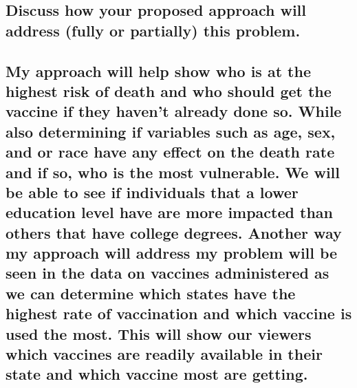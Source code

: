\documentclass[
]{article}
\begin{document}
\hypertarget{discuss-how-your-proposed-approach-will-address-fully-or-partially-this-problem.}{%
\subsection{Discuss how your proposed approach will address (fully or
partially) this
problem.}\label{discuss-how-your-proposed-approach-will-address-fully-or-partially-this-problem.}}

\hypertarget{my-approach-will-help-show-who-is-at-the-highest-risk-of-death-and-who-should-get-the-vaccine-if-they-havent-already-done-so.-while-also-determining-if-variables-such-as-age-sex-and-or-race-have-any-effect-on-the-death-rate-and-if-so-who-is-the-most-vulnerable.-we-will-be-able-to-see-if-individuals-that-a-lower-education-level-have-are-more-impacted-than-others-that-have-college-degrees.-another-way-my-approach-will-address-my-problem-will-be-seen-in-the-data-on-vaccines-administered-as-we-can-determine-which-states-have-the-highest-rate-of-vaccination-and-which-vaccine-is-used-the-most.-this-will-show-our-viewers-which-vaccines-are-readily-available-in-their-state-and-which-vaccine-most-are-getting.}{%
\subsection{My approach will help show who is at the highest risk of
death and who should get the vaccine if they haven't already done so.
While also determining if variables such as age, sex, and or race have
any effect on the death rate and if so, who is the most vulnerable. We
will be able to see if individuals that a lower education level have are
more impacted than others that have college degrees. Another way my
approach will address my problem will be seen in the data on vaccines
administered as we can determine which states have the highest rate of
vaccination and which vaccine is used the most. This will show our
viewers which vaccines are readily available in their state and which
vaccine most are
getting.}\label{my-approach-will-help-show-who-is-at-the-highest-risk-of-death-and-who-should-get-the-vaccine-if-they-havent-already-done-so.-while-also-determining-if-variables-such-as-age-sex-and-or-race-have-any-effect-on-the-death-rate-and-if-so-who-is-the-most-vulnerable.-we-will-be-able-to-see-if-individuals-that-a-lower-education-level-have-are-more-impacted-than-others-that-have-college-degrees.-another-way-my-approach-will-address-my-problem-will-be-seen-in-the-data-on-vaccines-administered-as-we-can-determine-which-states-have-the-highest-rate-of-vaccination-and-which-vaccine-is-used-the-most.-this-will-show-our-viewers-which-vaccines-are-readily-available-in-their-state-and-which-vaccine-most-are-getting.}}
\end{document}
